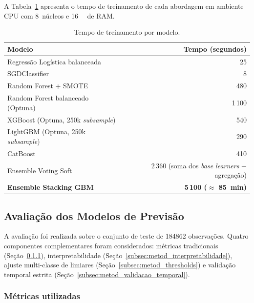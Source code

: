 A Tabela~\ref{tab:metod_tempos} apresenta o tempo de treinamento de cada abordagem em ambiente CPU com 8~núcleos e \SI{16}{\giga\byte} de RAM.

\begin{table}[h]
\centering
\caption{Tempo de treinamento por modelo.}
\label{tab:metod_tempos}
\small
\begin{tabular}{lr}
\toprule
\textbf{Modelo} & \textbf{Tempo (segundos)} \\
\midrule
Regressão Logística balanceada & 25 \\
SGDClassifier                  & 8 \\
Random Forest + SMOTE          & 480 \\
Random Forest balanceado (Optuna) & 1\,100 \\
XGBoost (Optuna, 250k \emph{subsample}) & 540 \\
LightGBM (Optuna, 250k \emph{subsample}) & 290 \\
CatBoost                       & 410 \\
Ensemble Voting Soft           & 2\,360 (soma dos \emph{base learners} + agregação) \\
\textbf{Ensemble Stacking GBM} & \textbf{5\,100 (\(\approx\) 85~min)} \\
\bottomrule
\end{tabular}
\end{table}

\subsection{Avaliação dos Modelos de Previsão}
\label{sec:metod_avaliacao}

A avaliação foi realizada sobre o conjunto de teste de \num{184862} observações. Quatro componentes complementares foram considerados: métricas tradicionais (Seção~\ref{subsec:metod_metricas}), interpretabilidade (Seção~\ref{subsec:metod_interpretabilidade}), ajuste multi-classe de limiares (Seção~\ref{subsec:metod_thresholds}) e validação temporal estrita (Seção~\ref{subsec:metod_validacao_temporal}).

\subsubsection{Métricas utilizadas}
\label{subsec:metod_metricas}

